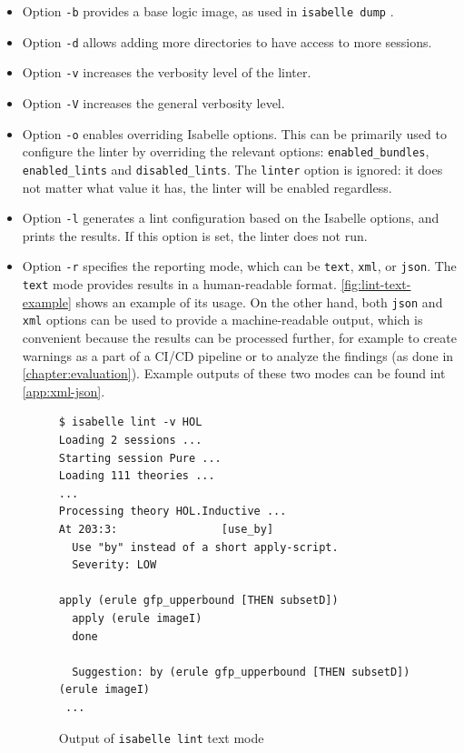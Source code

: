 \begin{itemize}
\item Option \texttt{-b} provides a base logic image, as used in
          \texttt{isabelle dump} \cite{isabelle-system}.
          
\item Option \texttt{-d} allows adding more directories to have access
to more sessions.

\item Option \texttt{-v} increases the verbosity level of the linter.

\item Option \texttt{-V} increases the general verbosity level.

\item Option \texttt{-o} enables overriding Isabelle options. This can be
primarily used to configure the linter by overriding the relevant
options: \texttt{enabled\_bundles}, \texttt{enabled\_lints} and
\texttt{disabled\_lints}. The \texttt{linter} option is ignored: it does not
matter what value it has, the linter will be enabled regardless.

\item Option \texttt{-l} generates a lint configuration based on the Isabelle
options, and prints the results. If this option is set, the linter does
not run.

\item Option \texttt{-r} specifies the reporting mode, which can be 
\texttt{text}, \texttt{xml}, or \texttt{json}. The \texttt{text} mode provides
results in a human-readable format. \autoref{fig:lint-text-example} shows
an example of its usage. On the other hand, both \texttt{json} and
\texttt{xml} options
can be used to provide a machine-readable output, which is convenient because
the results can be processed further, for example to create warnings as a part
of a CI/CD pipeline or to analyze the findings (as done in \autoref{chapter:evaluation}). Example outputs of these two modes can be found
int \autoref{app:xml-json}.
\begin{figure}
   \begin{lstlisting}
$ isabelle lint -v HOL
Loading 2 sessions ...
Starting session Pure ...
Loading 111 theories ...
...
Processing theory HOL.Inductive ...
At 203:3:                [use_by]
  Use "by" instead of a short apply-script.
  Severity: LOW

apply (erule gfp_upperbound [THEN subsetD])
  apply (erule imageI)
  done

  Suggestion: by (erule gfp_upperbound [THEN subsetD]) (erule imageI)
 ...
    \end{lstlisting}
    \caption{Output of 
    \texttt{isabelle lint} text mode}\label{fig:lint-text-example}
\end{figure}


\end{itemize}


